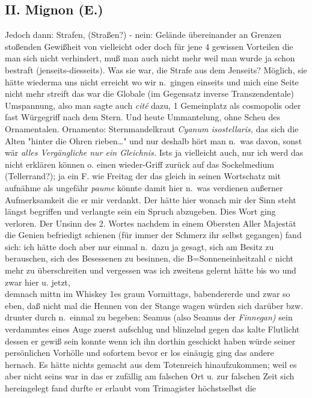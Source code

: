 \documentclass[
]{article}
\author{}
\date{\vspace{-2.5em}}
\begin{document}
\subsection{II. Mignon (E.)}\label{ii.-mignon-e.}

Jedoch dann: Strafen, (Straßen?) - nein: Gelände übereinander an Grenzen
stoßenden Gewißheit von vielleicht oder doch für jene 4 gewissen
Vorteilen die man sich nicht verhindert, muß man auch nicht mehr weil
man wurde ja schon bestraft (jenseits-diesseits). Was sie war, die
Strafe aus dem Jenseits? Möglich, sie hätte wiederma uns nicht erreicht
wo wir n.~gingen einseits und mich eine Seite nicht mehr streift das war
die Globale (im Gegensatz inverse Transzendentale) Umspannung, also man
sagte auch \emph{cité} dazu, 1 Gemeinplatz als cosmopolis oder fast
Würgegriff nach dem Stern. Und heute Ummantelung, ohne Scheu des
Ornamentalen. Ornamento: Sternmandelkraut \emph{Cyanum isostellaris,
}das sich die Alten "hinter die Ohren rieben\ldots" und nur deshalb hört
man n.~was davon, sonst wär \emph{alles Vergängliche nur ein Gleichnis.}
Ists ja vielleicht auch, nur ich werd das nicht erklären können o. einen
wieder-Griff zurück auf das Sockelmedium (Tellerrand?); ja ein F. wie
Freitag der das gleich in seinen Wortschatz mit aufnähme als ungefähr
\emph{paume} könnte damit hier n.~was verdienen außerner Aufmerksamkeit
die er mir verdankt. Der hätte hier wonach mir der Sinn steht längst
begriffen und verlangte sein ein Spruch abzugeben. Dies Wort ging
verloren. Der Unsinn des 2. Wortes nachdem in einem Obersten Aller
Majestät die Genien befriedigt schienen (für immer der Schmerz ihr
selbst gegangen) fand sich: ich hätte doch aber nur einmal n.~dazu ja
gesagt, sich am Besitz zu berauschen, sich des Besessenen zu besinnen,
die B=Sonneneinheitzahl c nicht mehr zu überschreiten und vergessen was
ich zweitens gelernt hätte bis wo und zwar hier u. jetzt,\\
demnach mittn im Whiskey 1es graun Vormittags, babendererde und zwar so
eben, daß nicht mal die Hennen von der Stange wagen würden sich darüber
bzw. drunter durch n.~einmal zu begeben: Seamus (also Seamus der
\emph{Finnegan) }sein verdammtes eines Auge zuerst aufschlug und
blinzelnd gegen das kalte Flutlicht dessen er gewiß sein konnte wenn ich
ihn dorthin geschickt haben würde seiner persönlichen Vorhölle und
sofortem bevor er los einäugig ging das andere hernach. Es hätte nichts
gemacht aus dem Totenreich hinaufzukommen; weil es aber nicht seins war
in das er zufällig am falschen Ort u. zur falschen Zeit sich
hereingelegt fand durfte er erlaubt vom Trimagister höchstselbst die
\end{document}
